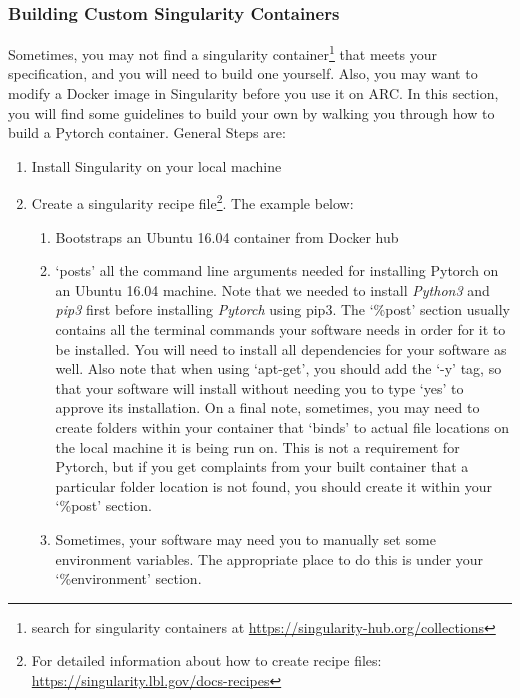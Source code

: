 \documentclass[]{article}
\begin{document}
\subsubsection{Building Custom Singularity Containers}
Sometimes, you may not find a singularity container\footnote{search for singularity containers at \url{https://singularity-hub.org/collections}} that meets your specification, and you will need to build one yourself. Also, you may want to modify a Docker image in Singularity before you use it on ARC. In this section, you will find some guidelines to build your own by walking you through how to build a Pytorch container.
General Steps are:
\begin{enumerate}
	\item Install Singularity on your local machine
	\item Create a singularity recipe file\footnote{For detailed information about how to create recipe files: \url{https://singularity.lbl.gov/docs-recipes}}. The example below:
	\begin{enumerate}
		\item Bootstraps an Ubuntu 16.04 container from Docker hub
		\item `posts' all the command line arguments needed for installing Pytorch on an Ubuntu 16.04 machine. Note that we needed to install \emph{Python3} and \emph{pip3} first before installing \emph{Pytorch} using pip3. The `\%post' section usually contains all the terminal commands your software needs in order for it to be installed. You will need to install all dependencies for your software as well. Also note that when using `apt-get', you should add the `-y' tag, so that your software will install without needing you to type `yes' to approve its installation. On a final note, sometimes, you may need to create folders within your container that `binds' to actual file locations on the local machine it is being run on. This is not a requirement for Pytorch, but if you get complaints from your built container that a particular folder location is not found, you should create it within your `\%post' section.
		\item Sometimes, your software may need you to manually set some environment variables. The appropriate place to do this is under your `\%environment' section.
		

\end{enumerate}
\end{enumerate}
\end{document}
